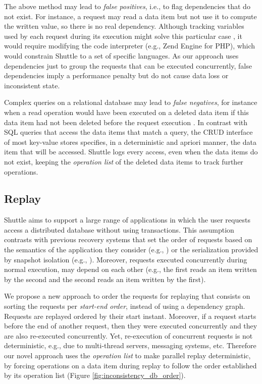 \documentclass[10pt,conference]{IEEEtran}
\begin{document}
The above method may lead to \emph{false positives}, i.e., to flag dependencies that do not exist. For instance, a request may read a data item but not use it to compute the written value, so there is no real dependency. Although tracking variables used by each request during its execution might solve this particular case \cite{Akkus2010}, it would require modifying the code interpreter (e.g., Zend Engine for PHP), which would constrain Shuttle to a set of specific languages. As our approach uses dependencies just to group the requests that can be executed concurrently, false dependencies imply a performance penalty but do not cause data loss or inconsistent state.

Complex queries on a relational database may lead to \emph{false negatives}, for instance when a read operation would have been executed on a deleted data item if this data item had not been deleted before the request execution \cite{Xie2008}. In contrast with SQL queries that access the data items that match a query, the \ac{CRUD} interface of most key-value stores specifies, in a deterministic and apriori manner, the data item that will be accessed. Shuttle logs every access, even when the data items do not exist, keeping the \emph{operation list} of the deleted data items to track further operations.


\subsection{Replay}
\label{sec:recovery:replay}

Shuttle aims to support a large range of applications in which the user requests access a distributed database without using transactions. This assumption contrasts with previous recovery systems that set the order of requests based on the semantics of the application they consider (e.g., \cite{undoForOperators}) or the serialization provided by snapshot isolation (e.g., \cite{Akkus2010}). Moreover, requests executed concurrently during  normal execution, may  depend on each other (e.g., the first reads an item written by the second and the second reads an item written by the first).

We propose a new approach to order the requests for replaying that consists on sorting the requests per \emph{start-end order}, instead of using a dependency graph. Requests are replayed ordered by their start instant. Moreover, if a request starts before the end of another request, then they were executed concurrently and they are also re-executed concurrently. 
Yet, re-execution of concurrent requests is not deterministic, e.g., due to multi-thread servers, messaging systems, etc. Therefore our novel approach uses the \emph{operation list} to make parallel replay deterministic, by forcing operations on a data item during replay to follow the order established by its operation list (Figure \ref{fig:inconsistency_db_order}).
\end{document}

